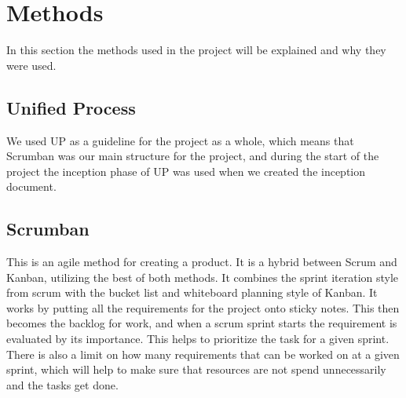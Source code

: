 
\section{Methods}

In this section the methods used in the project will be explained and why they were used.

\subsection{Unified Process}

We used UP as a guideline for the project as a whole, which means
that Scrumban was our main structure for the project, and during the
start of the project the inception phase of UP was used when we created
 the inception document.

\subsection{Scrumban}

This is an agile method for creating a product. It is a hybrid
between Scrum and Kanban, utilizing the best of both methods. It
 combines the sprint iteration style from scrum with the bucket list
  and whiteboard planning style of Kanban. It works by putting all the
   requirements for the project onto sticky notes. This then becomes the
    backlog for work, and when a scrum sprint starts the requirement is
     evaluated by its importance. This helps to prioritize the task for a
      given sprint. There is also a limit on how many requirements that can
       be worked on at a given sprint, which will help to make sure that
        resources are not spend unnecessarily and the tasks get done.
